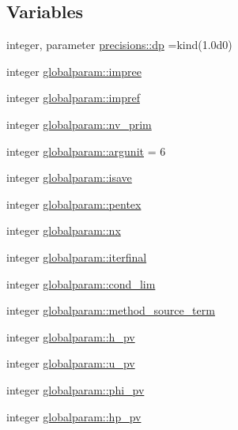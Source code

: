 \subsection*{Variables}
\begin{DoxyCompactItemize}
\item 
integer, parameter \mbox{\hyperlink{namespaceprecisions_a981a5ffa163c939af460d31f0e46fdab}{precisions\+::dp}} =kind(1.\+0d0)
\item 
integer \mbox{\hyperlink{namespaceglobalparam_a877f19a98e7a5d2d29ccb999f6a4b30b}{globalparam\+::impree}}
\item 
integer \mbox{\hyperlink{namespaceglobalparam_ac4d90a4b214d99ef729a938064face25}{globalparam\+::impref}}
\item 
integer \mbox{\hyperlink{namespaceglobalparam_a09fefe9eafe1d81a6be970794c775e36}{globalparam\+::nv\+\_\+prim}}
\item 
integer \mbox{\hyperlink{namespaceglobalparam_a0f36e5940fffe44f73fbab54574ce74d}{globalparam\+::argunit}} = 6
\item 
integer \mbox{\hyperlink{namespaceglobalparam_a41b8aacbc46aa9d8341860c8a0481a44}{globalparam\+::isave}}
\item 
integer \mbox{\hyperlink{namespaceglobalparam_abf663bfec615f440c89cb9f1edf516cf}{globalparam\+::pentex}}
\item 
integer \mbox{\hyperlink{namespaceglobalparam_a3d0778a63b55337acd79aa06b9030ad0}{globalparam\+::nx}}
\item 
integer \mbox{\hyperlink{namespaceglobalparam_a823f2901e26e8ed4b22569b63173f812}{globalparam\+::iterfinal}}
\item 
integer \mbox{\hyperlink{namespaceglobalparam_a0dfd817bc37d123c49006e2b980414c5}{globalparam\+::cond\+\_\+lim}}
\item 
integer \mbox{\hyperlink{namespaceglobalparam_a6a8f3df273709fb8e343e4443306d527}{globalparam\+::method\+\_\+source\+\_\+term}}
\item 
integer \mbox{\hyperlink{namespaceglobalparam_a46daf38606bdbc2d5b4a2864c28cae5e}{globalparam\+::h\+\_\+pv}}
\item 
integer \mbox{\hyperlink{namespaceglobalparam_acbf50879a37a52fcc5fc5e0f06b209ba}{globalparam\+::u\+\_\+pv}}
\item 
integer \mbox{\hyperlink{namespaceglobalparam_af964c2be0abbbecddbc35227f114fad2}{globalparam\+::phi\+\_\+pv}}
\item 
integer \mbox{\hyperlink{namespaceglobalparam_afcc135157423c01c0db73b3f23a35616}{globalparam\+::hp\+\_\+pv}}

\end{DoxyCompactItemize}
